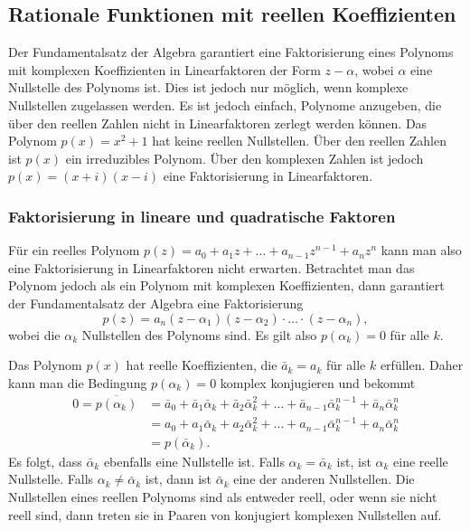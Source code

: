 %
%
%
\subsection{Rationale Funktionen mit reellen Koeffizienten}
Der Fundamentalsatz der Algebra garantiert eine Faktorisierung 
eines Polynoms mit komplexen Koeffizienten in Linearfaktoren
der Form $z-\alpha$, wobei $\alpha$ eine Nullstelle des Polynoms
ist.
%
Dies ist jedoch nur möglich, wenn komplexe Nullstellen zugelassen
werden.
%
Es ist jedoch einfach, Polynome anzugeben, die über den reellen Zahlen
nicht in Linearfaktoren zerlegt werden können.
Das Polynom $p(x)=x^2+1$ hat keine reellen Nullstellen.
Über den reellen Zahlen ist $p(x)$ ein irreduzibles Polynom.
Über den komplexen Zahlen ist jedoch $p(x)=(x+i)(x-i)$ eine
Faktorisierung in Linearfaktoren.
%

%
%
\subsubsection{Faktorisierung in lineare und quadratische Faktoren}
Für ein reelles Polynom 
$p(z) = a_0 + a_1z + \dots + a_{n-1}z^{n-1} + a_nz^n$
kann man also eine Faktorisierung in Linearfaktoren
nicht erwarten.
Betrachtet man das Polynom jedoch als ein Polynom mit komplexen
Koeffizienten, dann garantiert der Fundamentalsatz der Algebra eine
Faktorisierung
\[
p(z)
=
a_n
(z-\alpha_1) 
(z-\alpha_2) 
\cdot
\ldots
\cdot
(z-\alpha_n),
\]
wobei die $\alpha_k$ Nullstellen des Polynoms sind.
Es gilt also $p(\alpha_k)=0$ für alle $k$.

Das Polynom $p(x)$ hat reelle Koeffizienten, die $\bar{a}_k=a_k$
für alle $k$ erfüllen.
Daher kann man die Bedingung $p(\alpha_k)=0$ komplex konjugieren
und bekommt
\begin{align*}
0
=
\overline{p(\alpha_k)}
&=
\bar{a}_0
+
\bar{a}_1 \bar{\alpha}_k
+
\bar{a}_2 \bar{\alpha}_k^2
+
\ldots
+
\bar{a}_{n-1} \bar{\alpha}_k^{n-1}
+
\bar{a}_{n} \bar{\alpha}_k^{n}
\\
&=
a_0
+
a_1 \bar{\alpha}_k
+
a_2 \bar{\alpha}_k^2
+
\ldots
+
a_{n-1} \bar{\alpha}_k^{n-1}
+
a_{n} \bar{\alpha}_k^{n}
\\
&=
p(\bar{\alpha}_k).
\end{align*}
Es folgt, dass $\bar{\alpha}_k$ ebenfalls eine Nullstelle ist.
Falls $\alpha_k=\bar{\alpha}_k$ ist, ist $\alpha_k$ eine reelle
Nullstelle.
Falls $\alpha_k\ne \bar{\alpha}_k$ ist, dann ist $\bar{\alpha}_k$
eine der anderen Nullstellen.
Die Nullstellen eines reellen Polynoms sind als entweder reell,
oder wenn sie nicht reell sind, dann treten sie in Paaren von
konjugiert komplexen Nullstellen auf.

